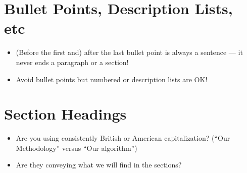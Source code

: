 \section{Bullet Points, Description Lists, etc}
\begin{itemize}

\item (Before the first and) after the last bullet point is always a sentence --- it never ends a paragraph or a section!
\item Avoid bullet points but numbered or description lists are OK!

\end{itemize}

\section{Section Headings}
\begin{itemize}

\item Are you using consistently British or American capitalization? (“Our Methodology” versus “Our algorithm”)
\item Are they conveying what we will find in the sections?

\end{itemize}

